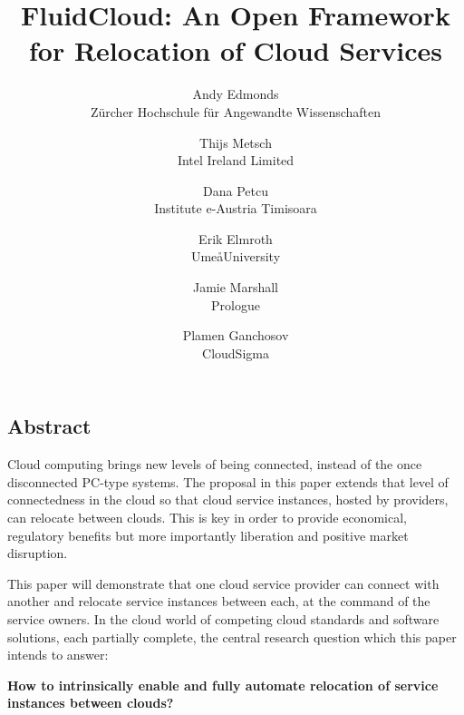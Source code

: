 \documentclass[letterpaper,twocolumn,10pt]{article}
\begin{document}
\date{}

\title{\Large \bf FluidCloud: An Open Framework for Relocation of Cloud Services}

\author{
{\rm Andy Edmonds}\\
Z\"urcher Hochschule f\"ur Angewandte Wissenschaften
\and
{\rm Thijs Metsch}\\
Intel Ireland Limited
\and
{\rm Dana Petcu}\\
Institute e-Austria Timisoara
\and
{\rm Erik Elmroth}\\
Ume\aa University
\and
{\rm Jamie Marshall}\\
Prologue
\and
{\rm Plamen Ganchosov}\\
CloudSigma
}

\maketitle


\subsection*{Abstract}

Cloud computing brings new levels of being connected, instead of the once disconnected 
PC-type systems. The proposal in this paper extends that level of connectedness in the cloud so that 
cloud service instances, hosted by providers, can relocate between clouds. This is key in order to 
provide economical, regulatory benefits but more importantly liberation and positive market disruption.

This paper will demonstrate that one cloud service provider can connect with another and 
relocate service instances between each, at the command of the service owners. In the cloud world of 
competing cloud standards and software solutions, each partially complete, the central research 
question which this paper intends to answer:

\textbf{How to intrinsically enable and fully automate relocation of service instances between clouds?}
\end{document}
